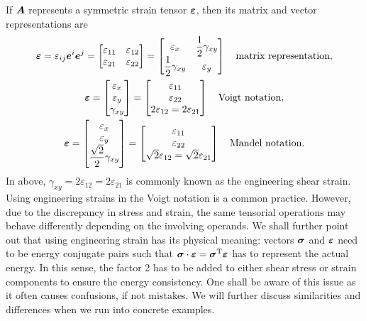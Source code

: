 If $\bm{A}$ represents a symmetric strain tensor $\bm{\varepsilon}$, then its matrix and vector representations are
\begin{gather}
\bm{\varepsilon}=\varepsilon_{ij}\bm{e}^i\bm{e}^j=\begin{bmatrix}
\varepsilon_{11}&\varepsilon_{12}\\
\varepsilon_{21}&\varepsilon_{22}
\end{bmatrix}=\begin{bmatrix}
\varepsilon_x&\dfrac{1}{2}\gamma_{xy}\\
\dfrac{1}{2}\gamma_{xy}&\varepsilon_y
\end{bmatrix}\quad\text{matrix representation},\\
\bm{\varepsilon}=\begin{bmatrix}
\varepsilon_x\\\varepsilon_y\\\gamma_{xy}
\end{bmatrix}=\begin{bmatrix}
\varepsilon_{11}\\\varepsilon_{22}\\2\varepsilon_{12}=2\varepsilon_{21}
\end{bmatrix}\quad\text{Voigt notation},\\
\bm{\varepsilon}=\begin{bmatrix}
\varepsilon_x\\\varepsilon_y\\\dfrac{\sqrt{2}}{2}\gamma_{xy}
\end{bmatrix}=\begin{bmatrix}
\varepsilon_{11}\\\varepsilon_{22}\\\sqrt{2}\varepsilon_{12}=\sqrt{2}\varepsilon_{21}
\end{bmatrix}\quad\text{Mandel notation}.
\end{gather}
In above, $\gamma_{xy}=2\varepsilon_{12}=2\varepsilon_{21}$ is commonly known as the engineering shear strain.
Using engineering strains in the Voigt notation is a common practice.
However, due to the discrepancy in stress and strain, the same tensorial operations may behave differently depending on the involving operands.
We shall further point out that using engineering strain has its physical meaning: vectors $\bm{\sigma}$ and $\bm{\varepsilon}$ need to be energy conjugate pairs such that $\bm{\sigma}\cdot\bm{\varepsilon}=\bm{\sigma}^{\mathrm{T}}\bm{\varepsilon}$ has to represent the actual energy.
In this sense, the factor \num{2} has to be added to either shear stress or strain components to ensure the energy consistency.
One shall be aware of this issue as it often causes confusions, if not mistakes.
We will further discuss similarities and differences when we run into concrete examples.

